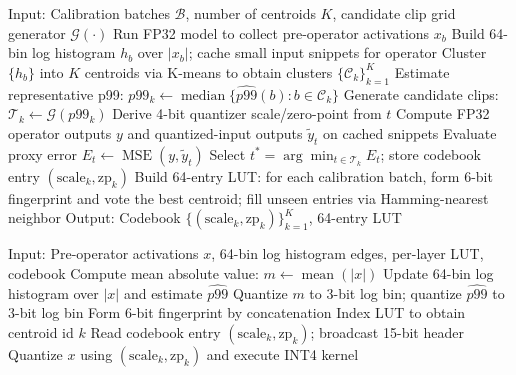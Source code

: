 \documentclass{article}
\begin{document}
\begin{algorithm}[H]
\caption{Offline Codebook Distillation per Layer}
\begin{algorithmic}[1]
\State Input: Calibration batches \(\mathcal{B}\), number of centroids \(K\), candidate clip grid generator \(\mathcal{G}(\cdot)\)
  \State Run FP32 model to collect pre-operator activations \(x_b\)
  \State Build 64-bin log histogram \(h_b\) over \(|x_b|\); cache small input snippets for operator
\EndFor
\State Cluster \(\{h_b\}\) into \(K\) centroids via K-means to obtain clusters \(\{\mathcal{C}_k\}_{k=1}^K\)
  \State Estimate representative p99: \(p99_k \leftarrow \operatorname{median}\{\widehat{p99}(b): b\in \mathcal{C}_k\}\)
  \State Generate candidate clips: \(\mathcal{T}_k \leftarrow \mathcal{G}(p99_k)\)
    \State Derive 4-bit quantizer scale/zero-point from \(t\)
    \State Compute FP32 operator outputs \(y\) and quantized-input outputs \(\tilde{y}_t\) on cached snippets
    \State Evaluate proxy error \(E_t \leftarrow \operatorname{MSE}(y, \tilde{y}_t)\)
  \EndFor
  \State Select \(t^* = \arg\min_{t\in \mathcal{T}_k} E_t\); store codebook entry \((\text{scale}_{k}, \text{zp}_{k})\)
\EndFor
\State Build 64-entry LUT: for each calibration batch, form 6-bit fingerprint and vote the best centroid; fill unseen entries via Hamming-nearest neighbor
\State Output: Codebook \(\{(\text{scale}_{k}, \text{zp}_{k})\}_{k=1}^K\), 64-entry LUT
\end{algorithmic}
\end{algorithm}

\begin{algorithm}[H]
\caption{Inference-Time Per-Batch Range Selection}
\begin{algorithmic}[1]
\State Input: Pre-operator activations \(x\), 64-bin log histogram edges, per-layer LUT, codebook
\State Compute mean absolute value: \(m \leftarrow \operatorname{mean}(|x|)\)
\State Update 64-bin log histogram over \(|x|\) and estimate \(\widehat{p99}\)
\State Quantize \(m\) to 3-bit log bin; quantize \(\widehat{p99}\) to 3-bit log bin
\State Form 6-bit fingerprint by concatenation
\State Index LUT to obtain centroid id \(k\)
\State Read codebook entry \((\text{scale}_{k}, \text{zp}_{k})\); broadcast 15-bit header
\State Quantize \(x\) using \((\text{scale}_{k}, \text{zp}_{k})\) and execute INT4 kernel
\end{algorithmic}
\end{algorithm}
\end{document}
